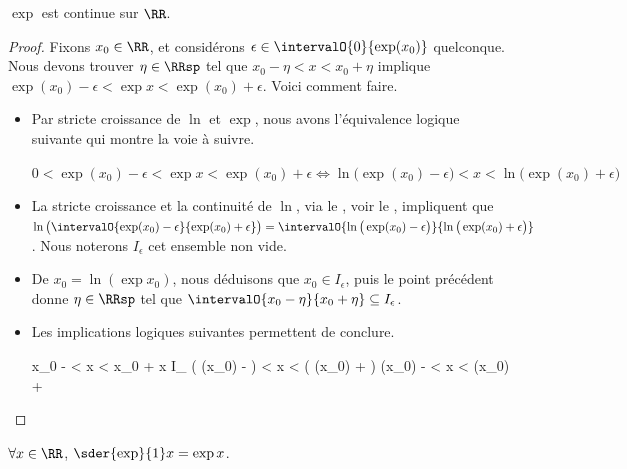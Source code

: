 \begin{fact} \label{exp-cont}
	$\exp$ est continue sur $\RR$.
\end{fact}


\begin{proof}
	Fixons $x_0 \in \RR$, et considérons $\epsilon \in \intervalO{0}{\exp(x_0)}$ quelconque.
	Nous devons trouver $\eta \in \RRsp$ tel que
	$x_0 - \eta < x < x_0 + \eta$
	implique
	$\exp(x_0) - \epsilon < \exp x < \exp(x_0) + \epsilon$. Voici comment faire.
	\begin{itemize}
		\item Par stricte croissance de $\ln$ et $\exp$, nous avons l'équivalence logique suivante qui montre la voie à suivre. 

		\noindent$
			0 < \exp(x_0) - \epsilon < \exp x < \exp(x_0) + \epsilon
			\iff
			\ln \big( \exp(x_0) - \epsilon \big) < x < \ln \big( \exp(x_0) + \epsilon \big)
		$


		\item La stricte croissance et la continuité de $\ln$, via le \tvi, voir le , impliquent que
		$\ln \big( \intervalO{\exp(x_0) - \epsilon}{\exp(x_0) + \epsilon} \big)
		=
		 \intervalO{\ln \big( \exp(x_0) - \epsilon \big)}{\ln \big( \exp(x_0) + \epsilon \big)}$.
		Nous noterons $I_{\epsilon}$ cet ensemble non vide.


		\item De $x_0 = \ln(\exp x_0)$, nous déduisons que $x_0 \in I_{\epsilon}$,
		puis le point précédent donne $\eta \in \RRsp$ tel que
		$\intervalO{x_0 - \eta}{x_0 + \eta} \subseteq I_{\epsilon}$.


		\item Les implications logiques suivantes permettent de conclure.
		
		\smallskip
		\leavevmode\kern-19pt\begin{stepcalc}[style=ar*, ope=\implies]
			x_0 - \eta < x < x_0 + \eta
		\explnext{}
			x \in I_{\epsilon}
		\explnext{}
			\ln \big( \exp(x_0) - \epsilon \big) < x < \ln \big( \exp(x_0) + \epsilon \big)
			\exp(x_0) - \epsilon < \exp x < \exp(x_0) + \epsilon
		\end{stepcalc}
	\end{itemize}
	
	\null
	\vspace{-4.5ex}
\end{proof}




\begin{fact}
	$\forall x \in \RR$,
	$\sder{\exp}{1} x = \exp x$.
\end{fact}


